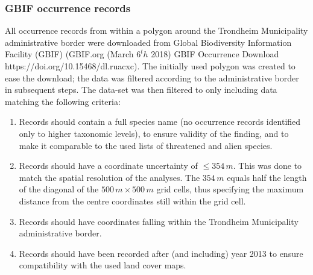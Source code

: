 \documentclass{article}
\begin{document}
\subsubsection{GBIF occurrence records}
All occurrence records from within a polygon around the Trondheim Municipality administrative border were downloaded from Global Biodiversity Information Facility (GBIF) (GBIF.org (March $6^th$ 2018) GBIF Occurrence Download  https://doi.org/10.15468/dl.ruacxc). The initially used polygon was created to ease the download; the data was filtered according to the administrative border in subsequent steps. The data-set was then filtered to only including data matching the following criteria:
\begin{enumerate}
    \item Records should contain a full species name (no occurrence records identified only to higher taxonomic levels), to ensure validity of the finding, and to make it comparable to the used lists of threatened and alien species.
    \item Records should have a coordinate uncertainty of $\leq354 \,m$. This was done to match the spatial resolution of the analyses. The $354\, m$ equals half the length of the diagonal of the $500\, m \times 500\, m$ grid cells, thus specifying the maximum distance from the centre coordinates still within the grid cell.
    \item Records should have coordinates falling within the Trondheim Municipality administrative border. %
    \item Records should have been recorded after (and including) year 2013 to ensure compatibility with the used land cover maps.
\end{enumerate}
\end{document}
